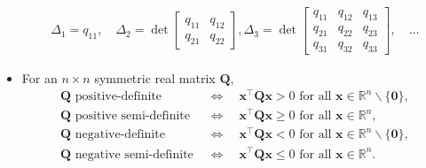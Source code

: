 \begin{itemize}
	\begin{equation*}
		\begin{gathered}
			\Delta_{1}=q_{11}, \quad \Delta_{2}=\operatorname{det}\left[\begin{array}{ll}
				q_{11} & q_{12} \\
				q_{21} & q_{22}
			\end{array}\right], 
			\Delta_{3}=\operatorname{det}\left[\begin{array}{lll}
				q_{11} & q_{12} & q_{13} \\
				q_{21} & q_{22} & q_{23} \\
				q_{31} & q_{32} & q_{33}
			\end{array}\right], \quad \ldots
		\end{gathered}
	\end{equation*}

	\item For an \(n \times n\) symmetric real matrix \(\boldsymbol{Q}\),
	\begin{equation*}
		\begin{aligned}
			\boldsymbol{Q} \text{ positive-definite }  &  \Longleftrightarrow \quad \boldsymbol{x}^{\top} \boldsymbol{Q} \boldsymbol{x}>0 \text { for all } \boldsymbol{x} \in \mathbb{R}^n \backslash\{\boldsymbol{0}\}, \\
			\boldsymbol{Q}  \text{ positive semi-definite } & \Longleftrightarrow \quad \boldsymbol{x}^{\top} \boldsymbol{Q} \boldsymbol{x} \geq 0 \text{ for all } \boldsymbol{x} \in \mathbb{R}^n, \\
			\boldsymbol{Q} \text { negative-definite } & \Longleftrightarrow \quad \boldsymbol{x}^{\top} \boldsymbol{Q} \boldsymbol{x}<0 \text { for all } \boldsymbol{x} \in \mathbb{R}^n \backslash\{\boldsymbol{0}\}, \\
			\boldsymbol{Q} \text { negative semi-definite } &\Longleftrightarrow \quad \boldsymbol{x}^{\top} \boldsymbol{Q} \boldsymbol{x} \leq 0 \text { for all } \boldsymbol{x} \in \mathbb{R}^n.
		\end{aligned}
	\end{equation*}
	

\end{itemize}

